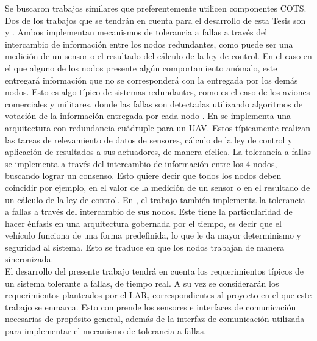 Se buscaron trabajos similares que preferentemente utilicen componentes COTS. Dos de los trabajos que se tendrán en cuenta para el desarrollo de esta Tesis son \cite{hiergeist2018implementation} y \cite{zhang2020architecture}. Ambos implementan mecanismos de tolerancia a fallas a través del intercambio de información entre los nodos redundantes, como puede ser una medición de un sensor o el resultado del cálculo de la ley de control. En el caso en el que alguno de los nodos presente algún comportamiento anómalo, este entregará información que no se corresponderá con la entregada por los demás nodos. Esto es algo típico de sistemas redundantes, como es el caso de los aviones comerciales y militares, donde las fallas son detectadas utilizando algoritmos de votación de la información entregada por cada nodo \cite[p.~217]{collinson2023introduction}. En \cite{hiergeist2018implementation} se implementa una arquitectura con redundancia cuádruple para un UAV. Estos típicamente realizan las tareas de relevamiento de datos de sensores, cálculo de la ley de control y aplicación de resultados a sus actuadores, de manera cíclica. La tolerancia a fallas se implementa a través del intercambio de información entre los 4 nodos, buscando lograr un consenso. Esto quiere decir que todos los nodos deben coincidir por ejemplo, en el valor de la medición de un sensor o en el resultado de un cálculo de la ley de control. En \cite{zhang2020architecture}, el trabajo también implementa la tolerancia a fallas a través del intercambio de sus nodos. Este tiene la particularidad de hacer énfasis en una arquitectura gobernada por el tiempo, es decir que el vehículo funciona de una forma predefinida, lo que le da mayor determinismo y seguridad al sistema. Esto se traduce en que los nodos trabajan de manera sincronizada.\\

El desarrollo del presente trabajo tendrá en cuenta los requerimientos típicos de un sistema tolerante a fallas, de tiempo real. A su vez se considerarán los requerimientos planteados por el LAR, correspondientes al proyecto en el que este trabajo se enmarca. Esto comprende los sensores e interfaces de comunicación necesarias de propósito general, además de la interfaz de comunicación utilizada para implementar el mecanismo de tolerancia a fallas.